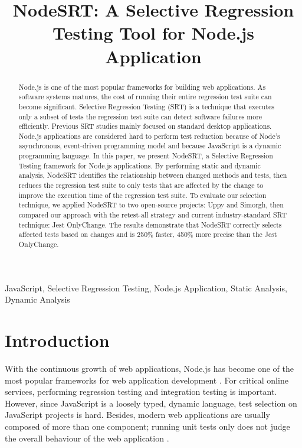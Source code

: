 \documentclass[10pt, conference]{IEEEtran}
\begin{document}
\title{NodeSRT: A Selective Regression Testing Tool for Node.js Application}

\author{
}

\maketitle

\begin{abstract}
Node.js is one of the most popular frameworks for building web applications. As software systems 
matures, the cost of running their entire regression test suite can become significant. 
Selective Regression Testing (SRT) is a technique that executes only a subset of tests the regression test suite can detect software failures more efficiently. 
Previous SRT studies mainly focused on standard desktop applications. Node.js applications are 
considered hard to perform test reduction because of Node's asynchronous, event-driven programming model and because  
JavaScript is a dynamic programming language. 
In this paper, we present NodeSRT, a Selective Regression Testing framework for Node.js applications. 
By performing static and dynamic analysis, NodeSRT identifies the relationship between changed methods and tests, 
then reduces the regression test suite to only tests that are 
affected by the change to improve the execution time of the regression test suite. 
To evaluate our selection technique, we applied NodeSRT to two open-source projects: Uppy and Simorgh, 
then compared our approach with the retest-all strategy and current industry-standard SRT technique: Jest 
OnlyChange. The results demonstrate that NodeSRT correctly selects affected tests based on 
changes and is 250\% faster, 450\% more precise than the Jest OnlyChange. 
    
\end{abstract}

\begin{IEEEkeywords}
JavaScript, Selective Regression Testing, Node.js Application, Static Analysis, Dynamic Analysis
\end{IEEEkeywords}

\section{Introduction}
With the continuous growth of web applications, Node.js has become one of the most popular frameworks 
for web application development \cite{b16}. For critical online services, performing regression testing and integration testing is important. However, 
since JavaScript is a loosely typed, dynamic language, test 
selection on JavaScript projects is hard. Besides, modern web applications are usually composed of 
more than one component; running unit tests only does not judge the overall behaviour of the web 
application \cite{b8}. 
\end{document}
